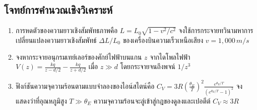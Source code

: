 \subsection{โจทย์การคำนวณเชิงวิเคราะห์}
\begin{enumerate}
    \item การหดตัวของความยาวเชิงสัมพัทธภาพคือ $L = L_0 \sqrt{1 - v^2/c^2}$ จงใช้การกระจายทวินามหาการเปลี่ยนแปลงความยาวเชิงสัมพัทธ์ $\Delta L / L_0$ ของเครื่องบินความเร็วเหนือเสียง $v = 1,000\,\si{m/s}$
    \item จงหากระจายอนุกรมเทย์เลอร์ของศักย์ไฟฟ้าบนแกน $z$ จากไดโพลไฟฟ้า $V(z) = \frac{kq}{z - d/2} - \frac{kq}{z + d/2}$ เมื่อ $z \gg d$ โดยกระจายจนถึงพจน์ $1/z^3$
    \item ฟังก์ชันความจุความร้อนตามแบบจำลองของไอน์สไตน์คือ $C_V = 3R \left(\frac{\theta_E}{T}\right)^2 \frac{e^{\theta_E/T}}{(e^{\theta_E/T}-1)^2}$ จงแสดงว่าที่อุณหภูมิสูง $T \gg \theta_E$ ความจุความร้อนจะลู่เข้าสู่กฎของดูลงและเปอตีต์ $C_V \approx 3R$
\end{enumerate}
